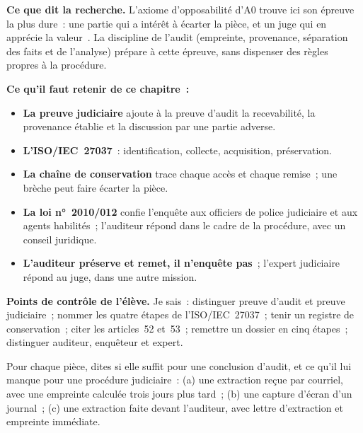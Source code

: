 \begin{boxinfo}
\textbf{Ce que dit la recherche.} L'axiome d'opposabilité d'A0 trouve ici
son épreuve la plus dure~: une partie qui a intérêt à écarter la pièce, et
un juge qui en apprécie la valeur~\cite{minka2026auditologie}. La
discipline de l'audit (empreinte, provenance, séparation des faits et de
l'analyse) prépare à cette épreuve, sans dispenser des règles propres à la
procédure.
\end{boxinfo}

\separateur

\begin{boxresume}
\textbf{Ce qu'il faut retenir de ce chapitre~:}
\begin{itemize}
    \item \textbf{La preuve judiciaire} ajoute à la preuve d'audit la
          recevabilité, la provenance établie et la discussion par une
          partie adverse.
    \item \textbf{L'ISO/IEC~27037}~: identification, collecte, acquisition,
          préservation.
    \item \textbf{La chaîne de conservation} trace chaque accès et chaque
          remise~; une brèche peut faire écarter la pièce.
    \item \textbf{La loi n°~2010/012} confie l'enquête aux officiers de
          police judiciaire et aux agents habilités~; l'auditeur répond dans
          le cadre de la procédure, avec un conseil juridique.
    \item \textbf{L'auditeur préserve et remet, il n'enquête pas}~;
          l'expert judiciaire répond au juge, dans une autre mission.
\end{itemize}
\end{boxresume}

\begin{boxinfo}
\textbf{Points de contrôle de l'élève.} Je sais~: distinguer preuve d'audit
et preuve judiciaire~; nommer les quatre étapes de l'ISO/IEC~27037~; tenir
un registre de conservation~; citer les articles~52 et~53~; remettre un
dossier en cinq étapes~; distinguer auditeur, enquêteur et expert.
\end{boxinfo}

\bigskip

\begin{boxexo}[title={\ding{45}\quad Exercice~29.1. Audit ou justice~? \niveaubase}]
Pour chaque pièce, dites si elle suffit pour une conclusion d'audit, et ce
qu'il lui manque pour une procédure judiciaire~: (a) une extraction reçue
par courriel, avec une empreinte calculée trois jours plus tard~; (b) une
capture d'écran d'un journal~; (c) une extraction faite devant l'auditeur,
avec lettre d'extraction et empreinte immédiate.
\end{boxexo}

